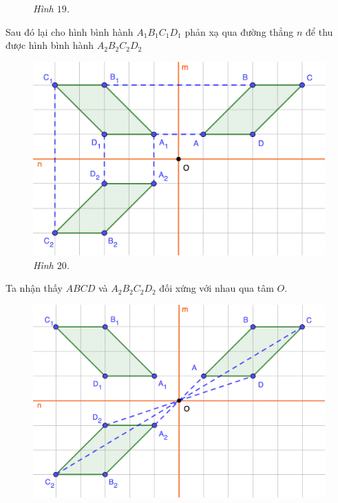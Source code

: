 \begin{multicols}{2}
\begin{figure}[H]
		\caption{\small\textit{\color{toancuabi}Hình $19$.}}
		\vspace*{-10pt}
	\end{figure}
	Sau đó lại cho hình bình hành $A_1B_1C_1D_1$ phản xạ qua đường thẳng $n$ để thu được hình bình hành $A_2B_2C_2D_2$
	\begin{figure}[H]
		\vspace*{5pt}
		\centering
		\captionsetup{labelformat= empty, justification=centering}
		\includegraphics[width= 1\linewidth]{19}
		\caption{\small\textit{\color{toancuabi}Hình $20$.}}
		\vspace*{-10pt}
	\end{figure}
	Ta nhận thấy $ABCD$ và $A_2B_2C_2D_2$ đối xứng với nhau qua tâm $O$.
	\begin{figure}[H]
		\vspace*{-5pt}
		\centering
		\captionsetup{labelformat= empty, justification=centering}
		\includegraphics[width= 1\linewidth]{20}

\end{figure}
\end{multicols}
